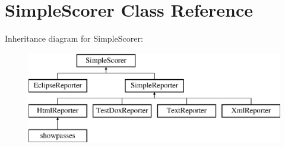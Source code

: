 \hypertarget{class_simple_scorer}{
\section{SimpleScorer Class Reference}
\label{class_simple_scorer}
}
Inheritance diagram for SimpleScorer:\begin{figure}[H]
\begin{center}
\leavevmode
\includegraphics[height=4.000000cm]{class_simple_scorer}
\end{center}
\end{figure}
